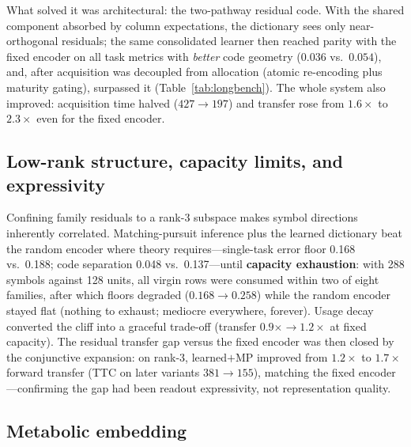 \documentclass[11pt]{article}
\begin{document}
What solved it was architectural: the two-pathway residual code. With the
shared component absorbed by column expectations, the dictionary sees only
near-orthogonal residuals; the same consolidated learner then reached
parity with the fixed encoder on all task metrics with \emph{better} code
geometry ($0.036$ vs.\ $0.054$), and, after acquisition was decoupled from
allocation (atomic re-encoding plus maturity gating), surpassed it
(Table~\ref{tab:longbench}). The whole system also improved: acquisition
time halved ($427 \to 197$) and transfer rose from $1.6\times$ to
$2.3\times$ even for the fixed encoder.

\subsection{Low-rank structure, capacity limits, and expressivity}

Confining family residuals to a rank-3 subspace makes symbol directions
inherently correlated. Matching-pursuit inference plus the learned
dictionary beat the random encoder where theory requires---single-task
error floor 0.168 vs.\ 0.188; code separation 0.048 vs.\ 0.137---until
\textbf{capacity exhaustion}: with 288 symbols against 128 units, all
virgin rows were consumed within two of eight families, after which floors
degraded ($0.168 \to 0.258$) while the random encoder stayed flat (nothing
to exhaust; mediocre everywhere, forever). Usage decay converted the cliff
into a graceful trade-off (transfer $0.9\times \to 1.2\times$ at fixed
capacity). The residual transfer gap versus the fixed encoder was then
closed by the conjunctive expansion: on rank-3, learned$+$MP improved from
$1.2\times$ to $1.7\times$ forward transfer (TTC on later variants
$381 \to 155$), matching the fixed encoder---confirming the gap had been
readout expressivity, not representation quality.

\subsection{Metabolic embedding}
\label{sec:thermo}
\end{document}
